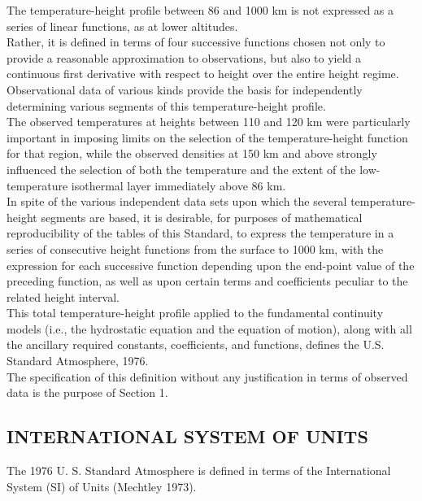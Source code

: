 \documentclass{article}
\begin{document}
The temperature-height profile between 86 and 1000 km is not expressed as a series of linear functions, as at lower altitudes.\\

Rather, it is defined in terms of four successive functions chosen not only to provide a reasonable approximation to observations, but also to yield a continuous first derivative with respect to height over the entire height regime.\\

Observational data of various kinds provide the basis for independently determining various segments of this temperature-height profile.\\
The observed temperatures at heights between 110 and 120 km were particularly important in imposing limits on the selection of the temperature-height function for that region, while the observed densities at 150 km and above strongly influenced the selection of both the temperature and the extent of the low-temperature isothermal layer immediately above 86 km.\\

In spite of the various independent data sets upon which the several temperature-height segments are based, it is desirable, for purposes of mathematical reproducibility of the tables of this Standard, to express the temperature in a series of consecutive height functions from the surface to 1000 km, with the expression for each successive function depending upon the end-point value of the preceding function, as well as upon certain terms and coefficients peculiar to the related height interval.\\

This total temperature-height profile applied to the fundamental continuity models (i.e., the hydrostatic equation and the equation of motion), along with all the ancillary required constants, coefficients, and functions, defines the U.S. Standard Atmosphere, 1976.\\
The specification of this definition without any justification in terms of observed data is the purpose of Section 1.\\

\subsection{INTERNATIONAL SYSTEM OF UNITS}

The 1976 U. S. Standard Atmosphere is defined in terms of the International System (SI) of Units (Mechtley 1973). \\
\end{document}
